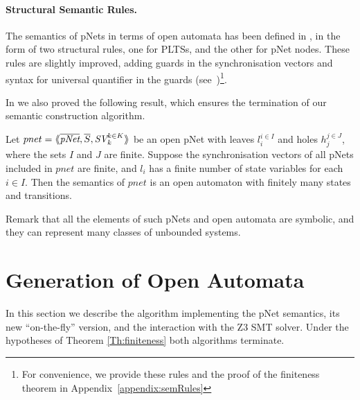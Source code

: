 \documentclass[smallcondensed]{svjour3}
\newcommand{\noteSB}[2][color=green!40, size=\tiny]{\todo[#1]{{\bf Simon: } {#2}}}
\newcommand{\noteEM}[2][color=blue!40, size=\tiny]{\todo[#1]{{\bf Eric: } {#2}}}
\newcommand{\ie}[1][\ ]{i.e.#1}
\begin{document}
\paragraph{Structural Semantic Rules.}
The semantics of pNets in terms of open automata has been defined in
\cite{henrio:Forte2016}, in the form of two structural rules, one for
PLTSs, and the other for pNet nodes. These rules are slightly improved, adding guards in the synchronisation vectors and syntax for universal quantifier in the guards (see~\cite{Avocs-RR})\footnote{For convenience, we provide these rules and the proof of the finiteness theorem in Appendix~\ref{appendix:semRules}}. 
  
In \cite{henrio:Forte2016} we also proved the following result, which
ensures the termination of our semantic construction algorithm.
\begin{theorem}[Finiteness]
  \label{Th:finiteness}
   Let $pnet=\mylangle \overline{\pNet},\overline{S}, \symb{SV}_k^{k\in K}\myrangle$ be an open pNet  with leaves $l_i^{i\in I}$ and holes $h_j^{j\in
 	J}$, where the sets $I$ and $J$ are finite. Suppose the synchronisation vectors of all pNets 
 included in  $pnet$   are finite, and 
 $l_i $ has a finite number of state variables for each $i\in I$. Then the semantics of $pnet$ is an open automaton 
 with finitely many states and transitions.
\end{theorem}
  Remark that all the elements of such pNets and open automata are symbolic, and they can represent many classes of unbounded systems. 


\section{Generation of Open Automata}
\label{section:implementation}
In this section we describe the algorithm implementing the pNet
semantics, its new ``on-the-fly'' version, and the interaction with the
Z3 SMT solver. Under the hypotheses of Theorem \ref{Th:finiteness} 
both algorithms terminate. 

\end{document}
